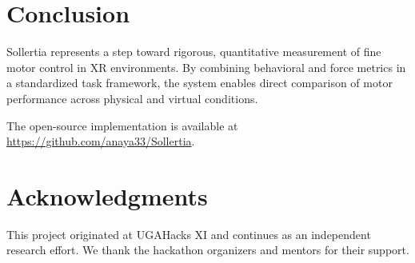 \documentclass[11pt,twocolumn]{article}
\begin{document}
\section{Conclusion}

Sollertia represents a step toward rigorous, quantitative measurement of fine motor control in XR environments. By combining behavioral and force metrics in a standardized task framework, the system enables direct comparison of motor performance across physical and virtual conditions.

The open-source implementation is available at \url{https://github.com/anaya33/Sollertia}.

\section*{Acknowledgments}

This project originated at UGAHacks XI and continues as an independent research effort. We thank the hackathon organizers and mentors for their support.



\end{document}
